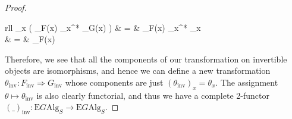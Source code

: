 \documentclass{amsart} %
\newenvironment{eq*}{\begin{equation*}}{\end{equation*}}
\begin{document}
\begin{proof}
\begin{eq*}
\begin{array}{rll}
		\theta_x \circ  \big( _{F(x)} \otimes \theta_{x^*} \otimes {}_{G(x)} \big) & = & _{F(x)} \otimes \theta_{x^*} \otimes \theta_x \\
		& = &  _{F(x)} \\
		\end{array} 
\end{eq*}
Therefore, we see that all the components of our transformation on invertible objects are isomorphisms, and hence we can define a new transformation $\theta_{\mathrm{inv}}: F_{\mathrm{inv}} \Rightarrow G_{\mathrm{inv}}$ whose components are just $(\theta_{\mathrm{inv}})_x = \theta_x$. The assignment $\theta \mapsto \theta_{\mathrm{inv}}$ is also clearly functorial, and thus we have a complete 2-functor $(\_)_{\mathrm{inv}}: \mathrm{E}G\mathrm{Alg}_S \to \mathrm{E}G\mathrm{Alg}_S$.
\end{proof}
\end{document}

